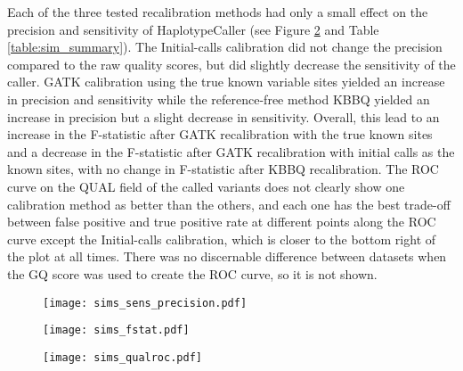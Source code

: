 Each of the three tested recalibration methods had only a small effect on the precision and sensitivity of HaplotypeCaller (see Figure \ref{fig:sim_sens_precision} and Table \ref{table:sim_summary}). The Initial-calls calibration did not change the precision compared to the raw quality scores, but did slightly decrease the sensitivity of the caller. GATK calibration using the true known variable sites yielded an increase in precision and sensitivity while the reference-free method KBBQ yielded an increase in precision but a slight decrease in sensitivity. Overall, this lead to an increase in the F-statistic after GATK recalibration with the true known sites and a decrease in the F-statistic after GATK recalibration with initial calls as the known sites, with no change in F-statistic after KBBQ recalibration. The ROC curve on the QUAL field of the called variants does not clearly show one calibration method as better than the others, and each one has the best trade-off between false positive and true positive rate at different points along the ROC curve except the Initial-calls calibration, which is closer to the bottom right of the plot at all times. There was no discernable difference between datasets when the GQ score was used to create the ROC curve, so it is not shown.

\begin{figure}
\centering
\texttt{[image: sims\_sens\_precision.pdf]}
\label{fig:sim_sens_precision}
\end{figure}

\begin{figure}
\centering
\texttt{[image: sims\_fstat.pdf]}
\label{fig:sim_sens_precision}
\end{figure}

\begin{figure}
\centering
\texttt{[image: sims\_qualroc.pdf]}
\label{fig:sim_qualroc}
\end{figure}


